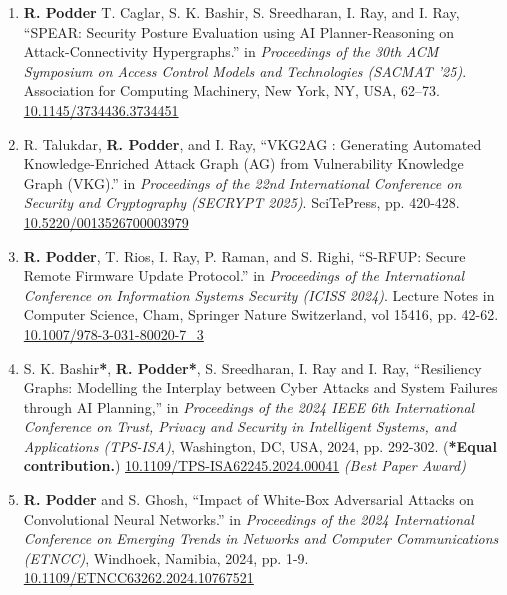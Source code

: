 \documentclass[11pt, a4paper]{article}
\begin{document}
\begin{enumerate}[leftmargin=*, label=\arabic*., itemsep=4pt, topsep=2pt]
\item \textbf{\color{cvred}R. Podder} T. Caglar, S. K. Bashir, S. Sreedharan, I. Ray, and I. Ray, ``SPEAR: Security Posture Evaluation using AI Planner-Reasoning on Attack-Connectivity Hypergraphs.'' in \textit{Proceedings of the 30th ACM Symposium on Access Control Models and Technologies (SACMAT '25)}. Association for Computing Machinery, New York, NY, USA, 62–73. \href{https://doi.org/10.1145/3734436.3734451}{\color{cvgray}10.1145/3734436.3734451}

\item R. Talukdar, \textbf{\color{cvred}R. Podder}, and I. Ray, ``VKG2AG : Generating Automated Knowledge-Enriched Attack Graph (AG) from Vulnerability Knowledge Graph (VKG).'' in \textit{Proceedings of the 22nd International Conference on Security and Cryptography (SECRYPT 2025)}. SciTePress, pp. 420-428. \href{https://www.scitepress.org/Papers/2025/135267/135267.pdf}{\color{cvgray}10.5220/0013526700003979}

\item \textbf{\color{cvred}R. Podder}, T. Rios, I. Ray, P. Raman, and S. Righi, ``S-RFUP: Secure Remote Firmware Update Protocol.'' in \textit{Proceedings of the International Conference on Information Systems Security (ICISS 2024)}. Lecture Notes in Computer Science, Cham, Springer Nature Switzerland, vol 15416, pp. 42-62. \href{https://doi.org/10.1007/978-3-031-80020-7_3}{\color{cvgray}10.1007/978-3-031-80020-7\_3}

\item S. K. Bashir\textbf{*}, \textbf{\color{cvred}R. Podder}\textbf{*}, S. Sreedharan, I. Ray and I. Ray, ``Resiliency Graphs: Modelling the Interplay between Cyber Attacks and System Failures through AI Planning,'' in \textit{Proceedings of the 2024 IEEE 6th International Conference on Trust, Privacy and Security in Intelligent Systems, and Applications (TPS-ISA)}, Washington, DC, USA, 2024, pp. 292-302. (\textbf{*Equal contribution.}) \href{https://doi.org/10.1109/TPS-ISA62245.2024.00041}{\color{cvgray}10.1109/TPS-ISA62245.2024.00041} \textit{(Best Paper Award)}

\item \textbf{\color{cvred}R. Podder} and S. Ghosh, ``Impact of White-Box Adversarial Attacks on Convolutional Neural Networks.'' in \textit{Proceedings of the 2024 International Conference on Emerging Trends in Networks and Computer Communications (ETNCC)}, Windhoek, Namibia, 2024, pp. 1-9. \href{https://doi.org/10.1109/ETNCC63262.2024.10767521}{\color{cvgray}10.1109/ETNCC63262.2024.10767521}


\end{enumerate}
\end{document}
